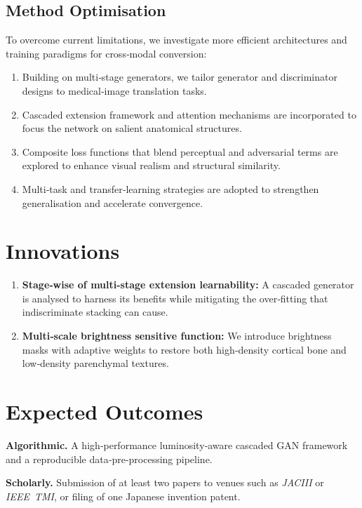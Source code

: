 \documentclass[twocolumn]{article}
\begin{document}
\subsection{Method Optimisation}
To overcome current limitations, we investigate more efficient architectures and training paradigms for cross‑modal conversion:
\begin{enumerate}
	\item Building on multi‑stage generators, we tailor generator and discriminator designs to medical‑image translation tasks.
	\item Cascaded extension framework and attention mechanisms are incorporated to focus the network on salient anatomical structures.
	\item Composite loss functions that blend perceptual and adversarial terms are explored to enhance visual realism and structural similarity.
	\item Multi‑task and transfer‑learning strategies are adopted to strengthen generalisation and accelerate convergence.
\end{enumerate}

\section{Innovations}
\begin{enumerate}
	\item \textbf{Stage‑wise of multi-stage extension learnability:} A cascaded generator is analysed to harness its benefits while mitigating the over‑fitting that indiscriminate stacking can cause.
	\item \textbf{Multi‑scale brightness sensitive function:} We introduce brightness masks with adaptive weights to restore both high‑density cortical bone and low‑density parenchymal textures.
\end{enumerate}

\section{Expected Outcomes}
\textbf{Algorithmic.} A high‑performance luminosity‑aware cascaded GAN framework and a reproducible data‑pre‑processing pipeline.

\textbf{Scholarly.} Submission of at least two papers to venues such as \emph{JACIII} or \emph{IEEE TMI}, or filing of one Japanese invention patent.







\end{document}
